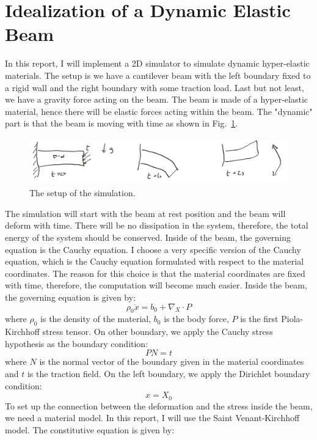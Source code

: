 \documentclass[acmtog]{acmart}
\begin{document}
\section{Idealization of a Dynamic Elastic Beam}
In this report, I will implement a 2D simulator to simulate dynamic hyper-elastic materials. The setup is we have a cantilever beam with the left boundary fixed to a rigid wall and the right boundary with some traction load. Last but not least, we have a gravity force acting on the beam. The beam is made of a hyper-elastic material, hence there will be elastic forces acting within the beam. The "dynamic" part is that the beam is moving with time as shown in Fig.~\ref{fig:setup}.
\begin{figure}[H]
    \centering
    \includegraphics[width=0.9\linewidth]{images/setup.png}
    \caption{The setup of the simulation.}
    \label{fig:setup}
  \end{figure}
The simulation will start with the beam at rest position and the beam will deform with time. There will be no dissipation in the system, therefore, the total energy of the system should be conserved. Inside of the beam, the governing equation is the Cauchy equation. I choose a very specific version of the Cauchy equation, which is the Cauchy equation formulated with respect to the material coordinates. The reason for this choice is that the material coordinates are fixed with time, therefore, the computation will become much easier. 
Inside the beam, the governing equation is given by:
\begin{equation*}
\rho_0 \ddot{x} = b_0 + \nabla_X \cdot P
\end{equation*}
where $\rho_0$ is the density of the material, $b_0$ is the body force, $P$ is the first Piola-Kirchhoff stress tensor. On other boundary, we apply the Cauchy stress hypothesis as the boundary condition:
\begin{equation*}
    PN = t
\end{equation*}
where $N$ is the normal vector of the boundary given in the material coordinates and $t$ is the traction field. On the left boundary, we apply the Dirichlet boundary condition:
\begin{equation*}
    x = X_0
\end{equation*}
To set up the connection between the deformation and the stress inside the beam, we need a material model. In this report, I will use the Saint Venant-Kirchhoff model. The constitutive equation is given by:
\end{document}

